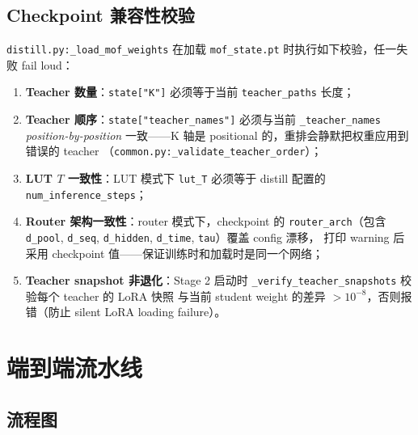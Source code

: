 \documentclass[11pt,a4paper]{article}
\theoremstyle{definition}
\begin{document}
\subsection{Checkpoint 兼容性校验}

\texttt{distill.py:\_load\_mof\_weights} 在加载 \texttt{mof\_state.pt}
时执行如下校验，任一失败 fail loud：

\begin{enumerate}[leftmargin=1.5em]
\item \textbf{Teacher 数量}：\texttt{state["K"]} 必须等于当前
  \texttt{teacher\_paths} 长度；
\item \textbf{Teacher 顺序}：\texttt{state["teacher\_names"]} 必须与当前
  \texttt{\_teacher\_names} \emph{position-by-position} 一致——K 轴是
  positional 的，重排会静默把权重应用到错误的 teacher
  （\texttt{common.py:\_validate\_teacher\_order}）；
\item \textbf{LUT $T$ 一致性}：LUT 模式下 \texttt{lut\_T} 必须等于
  distill 配置的 \texttt{num\_inference\_steps}；
\item \textbf{Router 架构一致性}：router 模式下，checkpoint 的
  \texttt{router\_arch}（包含 \texttt{d\_pool}, \texttt{d\_seq},
  \texttt{d\_hidden}, \texttt{d\_time}, \texttt{tau}）覆盖 config 漂移，
  打印 warning 后采用 checkpoint 值——保证训练时和加载时是同一个网络；
\item \textbf{Teacher snapshot 非退化}：Stage 2 启动时
  \texttt{\_verify\_teacher\_snapshots} 校验每个 teacher 的 LoRA 快照
  与当前 student weight 的差异 $> 10^{-8}$，否则报错（防止
  silent LoRA loading failure）。
\end{enumerate}

\section{端到端流水线}
\label{sec:e2e}

\subsection{流程图}
\end{document}
